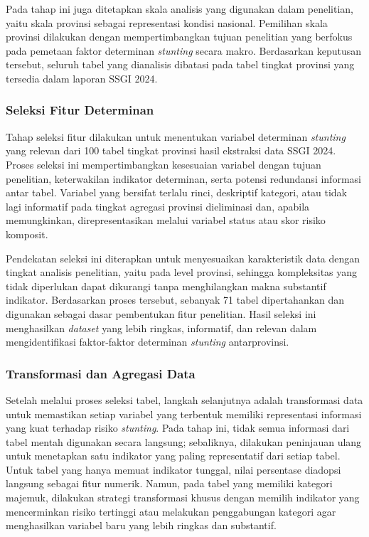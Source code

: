 Pada tahap ini juga ditetapkan skala analisis yang digunakan dalam penelitian, yaitu skala provinsi sebagai representasi kondisi nasional. Pemilihan skala provinsi dilakukan dengan mempertimbangkan tujuan penelitian yang berfokus pada pemetaan faktor determinan \textit{stunting} secara makro. Berdasarkan keputusan tersebut, seluruh tabel yang dianalisis dibatasi pada tabel tingkat provinsi yang tersedia dalam laporan SSGI 2024.

\subsubsection{Seleksi Fitur Determinan}
Tahap seleksi fitur dilakukan untuk menentukan variabel determinan \textit{stunting} yang relevan dari 100 tabel tingkat provinsi hasil ekstraksi data SSGI 2024. Proses seleksi ini mempertimbangkan kesesuaian variabel dengan tujuan penelitian, keterwakilan indikator determinan, serta potensi redundansi informasi antar tabel. Variabel yang bersifat terlalu rinci, deskriptif kategori, atau tidak lagi informatif pada tingkat agregasi provinsi dieliminasi dan, apabila memungkinkan, direpresentasikan melalui variabel status atau skor risiko komposit.

Pendekatan seleksi ini diterapkan untuk menyesuaikan karakteristik data dengan tingkat analisis penelitian, yaitu pada level provinsi, sehingga kompleksitas yang tidak diperlukan dapat dikurangi tanpa menghilangkan makna substantif indikator. Berdasarkan proses tersebut, sebanyak 71 tabel dipertahankan dan digunakan sebagai dasar pembentukan fitur penelitian. Hasil seleksi ini menghasilkan \textit{dataset} yang lebih ringkas, informatif, dan relevan dalam mengidentifikasi faktor-faktor determinan \textit{stunting} antarprovinsi.

\subsubsection{Transformasi dan Agregasi Data}
Setelah melalui proses seleksi tabel, langkah selanjutnya adalah transformasi data untuk memastikan setiap variabel yang terbentuk memiliki representasi informasi yang kuat terhadap risiko \textit{stunting}. Pada tahap ini, tidak semua informasi dari tabel mentah digunakan secara langsung; sebaliknya, dilakukan peninjauan ulang untuk menetapkan satu indikator yang paling representatif dari setiap tabel. Untuk tabel yang hanya memuat indikator tunggal, nilai persentase diadopsi langsung sebagai fitur numerik. Namun, pada tabel yang memiliki kategori majemuk, dilakukan strategi transformasi khusus dengan memilih indikator yang mencerminkan risiko tertinggi atau melakukan penggabungan kategori agar menghasilkan variabel baru yang lebih ringkas dan substantif.

